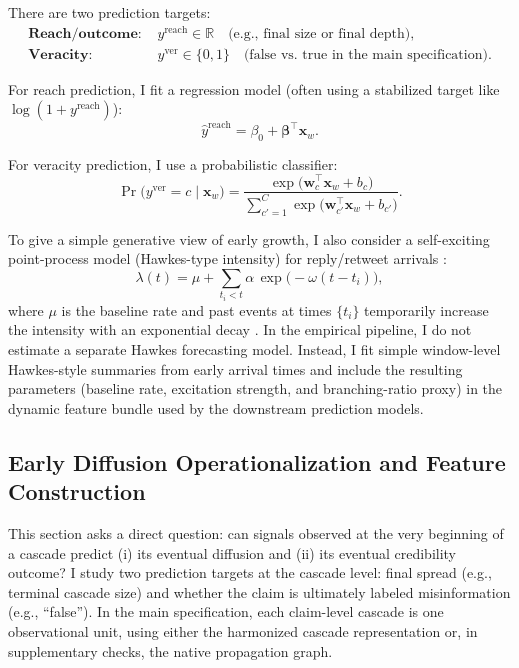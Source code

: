 There are two prediction targets:
\begin{align*}
\textbf{Reach/outcome: } & y^{\mathrm{reach}} \in \mathbb{R} \quad \text{(e.g., final size or final depth)},\\
\textbf{Veracity: } & y^{\mathrm{ver}} \in \{0,1\} \quad \text{(false vs.\ true in the main specification)}.
\end{align*}

For reach prediction, I fit a regression model (often using a stabilized target like $\log(1+y^{\mathrm{reach}})$):
\[
\widehat{y}^{\mathrm{reach}} = \beta_0 + \boldsymbol{\beta}^\top \mathbf{x}_w.
\]

For veracity prediction, I use a probabilistic classifier:
\[
\Pr\bigl(y^{\mathrm{ver}}=c\mid \mathbf{x}_w\bigr)
= \frac{\exp\bigl(\mathbf{w}_c^\top \mathbf{x}_w + b_c\bigr)}{\sum_{c'=1}^C \exp\bigl(\mathbf{w}_{c'}^\top \mathbf{x}_w + b_{c'}\bigr)}.
\]

To give a simple generative view of early growth, I also consider a self-exciting point-process model (Hawkes-type \parencite{hawkes1971spectra} intensity) for reply/retweet arrivals \parencite{crane2008robust}:
\[
\lambda(t) = \mu + \sum_{t_i < t} \alpha\,\exp\bigl(-\omega (t-t_i)\bigr),
\]
where $\mu$ is the baseline rate and past events at times $\{t_i\}$ temporarily increase the intensity with an exponential decay \parencite{rizoiu2017expecting, linderman2014discovering}.
In the empirical pipeline, I do not estimate a separate Hawkes forecasting model. Instead, I fit simple window-level Hawkes-style summaries from early arrival times and include the resulting parameters (baseline rate, excitation strength, and branching-ratio proxy) in the dynamic feature bundle used by the downstream prediction models.


\subsection{Early Diffusion Operationalization and Feature Construction}

This section asks a direct question: can signals observed at the very beginning of a cascade predict (i) its eventual diffusion and (ii) its eventual credibility outcome? I study two prediction targets at the cascade level: final spread (e.g., terminal cascade size) and whether the claim is ultimately labeled misinformation (e.g., ``false''). In the main specification, each claim-level cascade is one observational unit, using either the harmonized cascade representation or, in supplementary checks, the native propagation graph.

